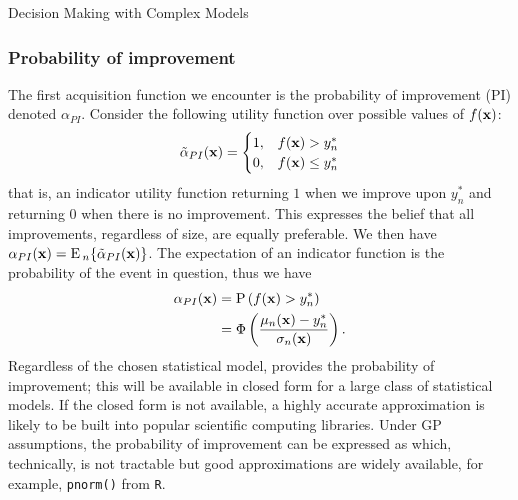 \begin{chapter}{Decision Making with Complex Models \label{Chap:optimisation}}
\subsubsection{Probability of improvement}
The first acquisition function we encounter is the probability of improvement (PI) denoted $\alpha_{PI}$. Consider the following utility function over possible values of $f(\mathbf{x})$:
\begin{equation}
 \tilde{\alpha}_{PI}(\mathbf{x}) =
 \begin{cases}
  1,& f(\mathbf{x}) > y^{*}_n \\
  0,& f(\mathbf{x}) \leq y^{*}_n
 \end{cases}
\end{equation}
that is, an indicator utility function returning $1$ when we improve upon $y_n^{*}$ and returning $0$ when there is no improvement. This expresses the belief that all improvements, regardless of size, are equally preferable. We then have $\alpha_{PI}(\mathbf{x}) = \textrm{E}\,_n \{ \tilde{\alpha}_{PI}(\mathbf{x}) \}$. The expectation of an indicator function is the probability of the event in question, thus we have
\begin{align}
 \alpha_{PI}(\mathbf{x}) &= \mathrm{P}\,(f(\mathbf{x}) > y^{*}_n)\label{Eq:prob-imp}\\
  &= \Phi\left(\frac{ \mu_{n}(\mathbf{x}) - y^{*}_n }{\sigma_{n}(\mathbf{x})}\right). \label{Eq:prob-imp-gp}
\end{align}
Regardless of the chosen statistical model,  provides the probability of improvement; this will be available in closed form for a large class of statistical models. If the closed form is not available, a highly accurate approximation is likely to be built into popular scientific computing libraries. Under GP assumptions, the probability of improvement can be expressed as  which, technically, is not tractable but good approximations are widely available, for example, \texttt{pnorm()} from \texttt{R}.

\end{chapter}
